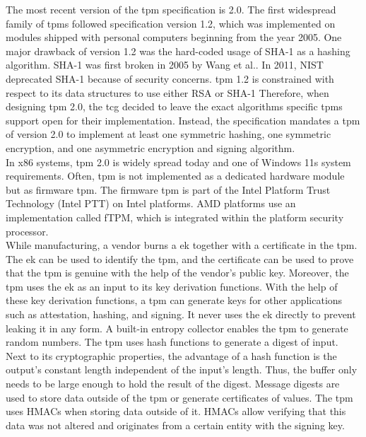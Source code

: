The most recent version of the \gls{tpm} specification is 2.0. The first
widespread family of \glspl{tpm} followed specification version 1.2, which was
implemented on modules shipped with personal computers beginning from the year
2005.\cite{arthur2015practical} One major drawback of version 1.2 was the
hard-coded usage of SHA-1 as a hashing algorithm. SHA-1 was first broken in 2005
by Wang et al.\cite{wang2005collision}. In 2011, NIST deprecated SHA-1 because
of security concerns.\cite{nist-sha1} \gls{tpm} 1.2 is constrained with respect
to its data structures to use either RSA or SHA-1\cite{tpm_architecture}
Therefore, when designing \gls{tpm} 2.0, the \gls{tcg} decided to leave the
exact algorithms specific \glspl{tpm} support open for their implementation.
Instead, the specification mandates a \gls{tpm} of version 2.0 to implement at
least one symmetric hashing, one symmetric encryption, and one asymmetric
encryption and signing algorithm. \\

In x86 systems, \gls{tpm} 2.0 is widely spread today and one of Windows 11s
system requirements. Often, \gls{tpm} is not implemented as a dedicated hardware
module but as firmware \gls{tpm}. The firmware \gls{tpm} is part of the Intel
Platform Trust Technology (Intel PTT) on Intel platforms. AMD platforms use an
implementation called fTPM, which is integrated within the platform security
processor.\cite{pirker2024brief} \\

While manufacturing, a vendor burns a \gls{ek} together with a certificate in
the \gls{tpm}. The \gls{ek} can be used to identify the \gls{tpm}, and the
certificate can be used to prove that the \gls{tpm} is genuine with the help of
the vendor's public key. Moreover, the \gls{tpm} uses the \gls{ek} as an input
to its key derivation functions. With the help of these key derivation
functions, a \gls{tpm} can generate keys for other applications such as
attestation, hashing, and signing. It never uses the \gls{ek} directly to
prevent leaking it in any form. A built-in entropy collector enables the
\gls{tpm} to generate random numbers. The \gls{tpm} uses hash functions to
generate a digest of input. Next to its cryptographic properties, the advantage
of a hash function is the output's constant length independent of the input's
length. Thus, the buffer only needs to be large enough to hold the result of the
digest. Message digests are used to store data outside of the \gls{tpm} or
generate certificates of values. The \gls{tpm} uses HMACs when storing data
outside of it. HMACs allow verifying that this data was not altered and
originates from a certain entity with the signing key.\\

